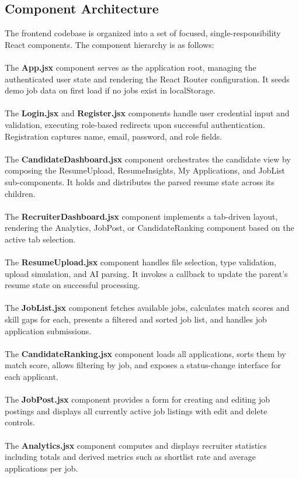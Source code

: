 \subsection{Component Architecture}
\medskip
The frontend codebase is organized into a set of focused, single-responsibility React components. The component hierarchy is as follows:\\\\
\noindent
The \textbf{App.jsx} component serves as the application root, managing the authenticated user state and rendering the React Router configuration. It seeds demo job data on first load if no jobs exist in localStorage.\\\\
\noindent
The \textbf{Login.jsx} and \textbf{Register.jsx} components handle user credential input and validation, executing role-based redirects upon successful authentication. Registration captures name, email, password, and role fields.\\\\
\noindent
The \textbf{CandidateDashboard.jsx} component orchestrates the candidate view by composing the ResumeUpload, ResumeInsights, My Applications, and JobList sub-components. It holds and distributes the parsed resume state across its children.\\\\
\noindent
The \textbf{RecruiterDashboard.jsx} component implements a tab-driven layout, rendering the Analytics, JobPost, or CandidateRanking component based on the active tab selection.\\\\
\noindent
The \textbf{ResumeUpload.jsx} component handles file selection, type validation, upload simulation, and AI parsing. It invokes a callback to update the parent's resume state on successful processing.\\\\
\noindent
The \textbf{JobList.jsx} component fetches available jobs, calculates match scores and skill gaps for each, presents a filtered and sorted job list, and handles job application submissions.\\\\
\noindent
The \textbf{CandidateRanking.jsx} component loads all applications, sorts them by match score, allows filtering by job, and exposes a status-change interface for each applicant.\\\\
\noindent
The \textbf{JobPost.jsx} component provides a form for creating and editing job postings and displays all currently active job listings with edit and delete controls.\\\\
\noindent
The \textbf{Analytics.jsx} component computes and displays recruiter statistics including totals and derived metrics such as shortlist rate and average applications per job.

